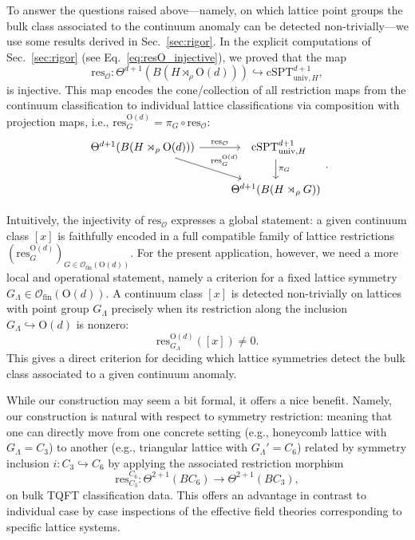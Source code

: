 \documentclass[aps,prx,reprint,superscriptaddress,twocolumn,amsmath,amssymb,amsfonts, nofootinbib]{revtex4-2}
\newcommand{\ofin}{\mathcal{O}_{\text{fin}}}
\newcommand{\res}{\text{res}}
\theoremstyle{apsstyle}
\begin{document}
To answer the questions raised above—namely, on which lattice point groups the bulk class associated to the continuum anomaly can be detected non-trivially—we use some results derived in Sec.~\ref{sec:rigor}. 
In the explicit computations of Sec.~\ref{sec:rigor} (see Eq.~\ref{eq:resO_injective}), we proved that the map
\begin{equation*}
    \res_{\mathcal{O}}:\Theta^{d+1}(B(H\rtimes_{\rho} \mathrm{O}(d)))\hookrightarrow 
    \mathrm{cSPT}^{d+1}_{\mathrm{univ},H},
\end{equation*}
is injective. This map encodes the cone/collection of all restriction maps from the continuum classification to individual lattice classifications via composition with projection maps, i.e., $\res^{\mathrm{O}(d)}_{G}= \pi_{G}\circ \res_{\mathcal{O}}$:
\begin{equation*}
    \begin{tikzcd}
        \Theta^{d+1}(B(H\rtimes_{\rho} \mathrm{O}(d))) \arrow[dr, "\res^{\mathrm{O}(d)}_{G}"]\arrow[r, "\res_{\mathcal{O}}"] &\;\;\mathrm{cSPT}^{d+1}_{\mathrm{univ},H} \arrow[d, "\pi_{G}"]\\
        & \Theta^{d+1}(B(H\rtimes_{\rho} G))
    \end{tikzcd}.
\end{equation*}

Intuitively, the injectivity of $\res_{\mathcal{O}}$ expresses a global statement: a given continuum class $[x]$ is faithfully encoded in a full compatible family of lattice restrictions $(\res^{\mathrm{O}(d)}_{G})_{G\in \ofin(\mathrm{O}(d))}$. 
For the present application, however, we need a more local and operational statement, namely a criterion for a fixed lattice symmetry $G_{\Lambda}\in \ofin(\mathrm{O}(d))$. 
A continuum class $[x]$ is detected non-trivially on lattices with point group $G_{\Lambda}$ precisely when its restriction along the inclusion $G_{\Lambda}\hookrightarrow \mathrm{O}(d)$ is nonzero:
\begin{equation*}
    \res^{\mathrm{O}(d)}_{G_{\Lambda}}([x])\neq 0.
\end{equation*}
This gives a direct criterion for deciding which lattice symmetries detect the bulk class associated to a given continuum anomaly.

\bigskip 

While our construction may seem a bit formal, it offers a nice benefit. Namely, our construction is natural with respect to symmetry restriction: meaning that one can directly move from one concrete setting (e.g., honeycomb lattice with $G_{\Lambda}=C_{3}$) to another (e.g., triangular lattice with $G_{\Lambda}'=C_{6}$) related by symmetry inclusion $i: C_{3}\hookrightarrow C_{6}$ by applying the associated restriction morphism 
\begin{equation*}
\res^{C_{6}}_{C_{3}}: \Theta^{2+1}(BC_{6}) \to \Theta^{2+1}(BC_{3}), 
\end{equation*}
on bulk TQFT classification data. This offers an advantage in contrast to individual case by case inspections of the effective field theories corresponding to specific lattice systems.
\end{document}
